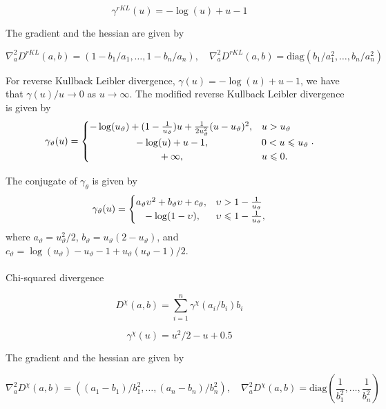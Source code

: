 \documentclass[
  letterpaper,
  DIV=11,
  numbers=noendperiod]{scrartcl}
\makeatletter
\let\oldparagraph\paragraph
\renewcommand{\paragraph}{
    \@ifstar
      \xxxParagraphStar
      \xxxParagraphNoStar
  }
\newcommand{\xxxParagraphStar}[1]{\oldparagraph*{#1}\mbox{}}
\newcommand{\xxxParagraphNoStar}[1]{\oldparagraph{#1}\mbox{}}
\makeatother
\begin{document}
\[
\gamma^{rKL}(u) = -\log(u) + u - 1
\]

The gradient and the hessian are given by

\[
\nabla_{a}^{2}D^{rKL}(a,b) = \left(1-b_1/a_1,\ldots, 1 - b_n/a_n
\right), \quad \nabla_{a}^{2}D^{rKL}(a,b) = \mathrm{diag}(b_1/a^2_1, \ldots, b_n/a^2_n)
\]

For reverse Kullback Leibler divergence, \(\gamma(u)=-\log(u)+u-1\), we
have that \(\gamma(u)/u \to 0\) as \(u\to\infty\). The modified reverse
Kullback Leibler divergence is given by \[
    \gamma_{\vartheta}(u) =
    \begin{cases}
      -\log(u_{\vartheta}) + (1-\frac{1}{u_{\vartheta}})u+ \frac{1}{2u_{\vartheta}^2}(u-u_{\vartheta})^2, &  u>u_{\vartheta}\\
      \newline -\log(u) + u - 1, &0 < u\leqslant u_{\vartheta}\\
      \newline +\infty, & u\leqslant0.
    \end{cases}.
\]

The conjugate of \(\gamma_{\theta}\) is given by \[
    \gamma_{\vartheta}(u) =
    \begin{cases}
      a_{\vartheta}\upsilon^2 + b_{\vartheta}\upsilon + c_{\vartheta}, & \upsilon > 1-\frac{1}{u_{\vartheta}} \\
    \newline -\log(1- \upsilon), & \upsilon \leqslant 1-\frac{1}{u_{\vartheta}},
    \end{cases}
\] where \(a_{\vartheta}=u^2_{\vartheta}/2\),
\(b_{\vartheta}=u_{\vartheta}(2-u_{\vartheta})\), and
\(c_{\vartheta}=\log(u_{\vartheta})-u_{\vartheta}-1+u_{\vartheta}(u_{\vartheta}-1)/2\).

\paragraph{Chi-squared divergence}\label{chi-squared-divergence}

\[
D^{\chi}(a,b) = \sum_{i=1}^n \gamma^{\chi}(a_i/b_i) b_i
\]

\[
\gamma^{\chi}(u) = u^2/2 - u + 0.5
\]

The gradient and the hessian are given by

\[
\nabla_{a}^{2}D^{\chi}(a,b) = \left((a_1 - b_1)/b_1^2, \ldots, (a_n - b_n)/b_n^2
\right), \quad \nabla_{a}^{2}D^{\chi}(a,b) =
\mathrm{diag}\left(\frac{1}{b_1^2},\ldots, \frac{1}{b_n^2}\right)
\]
\end{document}
